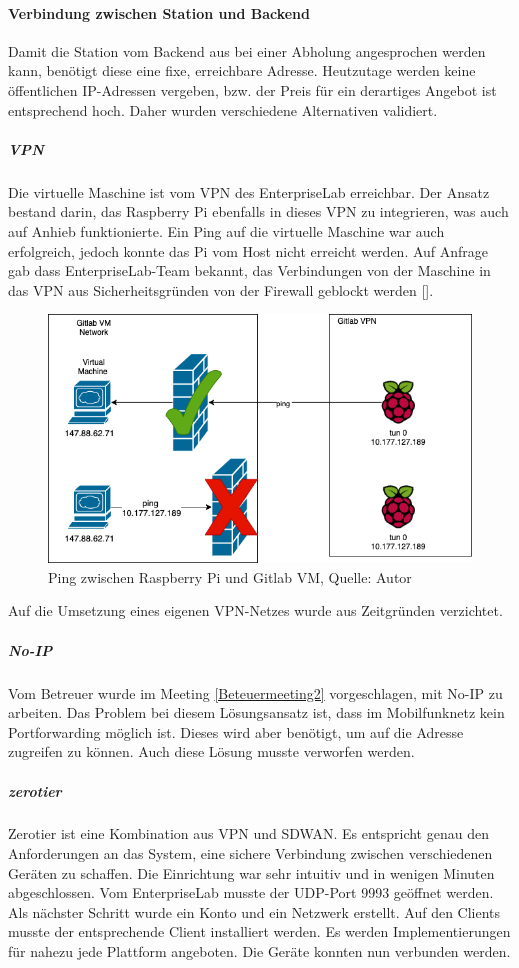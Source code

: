 \paragraph{Verbindung zwischen Station und Backend}
Damit die Station vom Backend aus bei einer Abholung angesprochen werden kann, benötigt diese eine fixe, erreichbare Adresse. Heutzutage werden keine öffentlichen IP-Adressen vergeben, bzw. der Preis für ein derartiges Angebot ist entsprechend hoch. Daher wurden verschiedene Alternativen validiert.
\newpage 
\subparagraph{VPN}
Die virtuelle Maschine ist vom VPN des \gls{EnterpriseLab} erreichbar. Der Ansatz bestand darin, das Raspberry Pi ebenfalls in dieses \ac{VPN} zu integrieren, was auch auf Anhieb funktionierte. Ein Ping auf die virtuelle Maschine war auch erfolgreich, jedoch konnte das Pi vom Host nicht erreicht werden. Auf Anfrage gab dass \gls{EnterpriseLab}-Team bekannt, das Verbindungen von der Maschine in das \ac{VPN} aus Sicherheitsgründen von der Firewall geblockt werden [\cite{chatVonUslar:private}]. 
\begin{figure}[H]
	\centering
	\includegraphics[scale=0.4]{images/enterpriselabVPN.PNG}
	\caption[Ping zwischen Raspberry Pi und Gitlab VM]{Ping zwischen Raspberry Pi und Gitlab VM, Quelle: Autor}
	\label{img: enterpriselabVPN}
\end{figure} 
Auf die Umsetzung eines eigenen VPN-Netzes wurde aus Zeitgründen verzichtet. 
\subparagraph{No-IP}
Vom Betreuer wurde im Meeting \ref{Beteuermeeting2} vorgeschlagen, mit No-IP zu arbeiten. Das Problem bei diesem Lösungsansatz ist, dass im Mobilfunknetz kein Portforwarding möglich ist. Dieses wird aber benötigt, um auf die Adresse zugreifen zu können. Auch diese Lösung musste verworfen werden. 
\subparagraph{zerotier}
Zerotier ist eine Kombination aus \ac{VPN} und \gls{SDWAN}. Es entspricht genau den Anforderungen an das System, eine sichere Verbindung zwischen verschiedenen Geräten zu schaffen. Die Einrichtung war sehr intuitiv und in wenigen Minuten abgeschlossen. Vom \gls{EnterpriseLab} musste der \ac{UDP}-Port 9993 geöffnet werden. Als nächster Schritt wurde ein Konto und ein Netzwerk erstellt. Auf den Clients musste der entsprechende Client installiert werden. Es werden Implementierungen für nahezu jede Plattform angeboten. Die Geräte konnten nun verbunden werden. 

